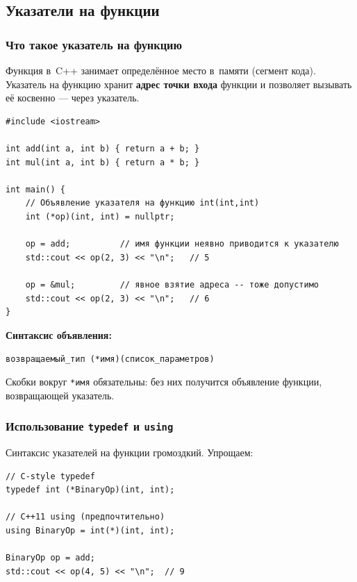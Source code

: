 \documentclass[a4paper,12pt]{article}
\begin{document}
\subsection{Указатели на функции}

\subsubsection{Что такое указатель на функцию}

Функция в~C++ занимает определённое место в~памяти (сегмент кода).
Указатель на функцию хранит \textbf{адрес точки входа} функции и позволяет
вызывать её косвенно --- через указатель.

\begin{lstlisting}
#include <iostream>

int add(int a, int b) { return a + b; }
int mul(int a, int b) { return a * b; }

int main() {
    // Объявление указателя на функцию int(int,int)
    int (*op)(int, int) = nullptr;

    op = add;          // имя функции неявно приводится к указателю
    std::cout << op(2, 3) << "\n";   // 5

    op = &mul;         // явное взятие адреса -- тоже допустимо
    std::cout << op(2, 3) << "\n";   // 6
}
\end{lstlisting}

\textbf{Синтаксис объявления:}

\begin{center}
\texttt{возвращаемый\_тип (*имя)(список\_параметров)}
\end{center}

Скобки вокруг \texttt{*имя} обязательны: без них получится объявление функции,
возвращающей указатель.

\subsubsection{Использование \texttt{typedef} и \texttt{using}}

Синтаксис указателей на функции громоздкий. Упрощаем:

\begin{lstlisting}
// C-style typedef
typedef int (*BinaryOp)(int, int);

// C++11 using (предпочтительно)
using BinaryOp = int(*)(int, int);

BinaryOp op = add;
std::cout << op(4, 5) << "\n";  // 9
\end{lstlisting}
\end{document}

